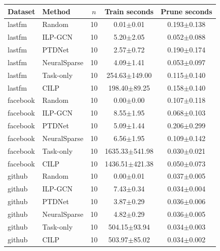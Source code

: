 \begin{tabular}{@{}llccc@{}}
\toprule
Dataset & Method & $n$ & Train seconds & Prune seconds \\
\midrule
lastfm & Random & 10 & 0.01$\pm$0.01 & 0.193$\pm$0.138 \\
lastfm & ILP-GCN & 10 & 5.20$\pm$2.05 & 0.052$\pm$0.088 \\
lastfm & PTDNet & 10 & 2.57$\pm$0.72 & 0.190$\pm$0.174 \\
lastfm & NeuralSparse & 10 & 4.09$\pm$1.41 & 0.053$\pm$0.097 \\
lastfm & Task-only & 10 & 254.63$\pm$149.00 & 0.115$\pm$0.140 \\
lastfm & CILP & 10 & 198.40$\pm$89.25 & 0.158$\pm$0.140 \\
facebook & Random & 10 & 0.00$\pm$0.00 & 0.107$\pm$0.118 \\
facebook & ILP-GCN & 10 & 8.55$\pm$1.95 & 0.068$\pm$0.103 \\
facebook & PTDNet & 10 & 5.09$\pm$1.44 & 0.206$\pm$0.299 \\
facebook & NeuralSparse & 10 & 6.56$\pm$1.95 & 0.109$\pm$0.142 \\
facebook & Task-only & 10 & 1635.33$\pm$541.98 & 0.030$\pm$0.021 \\
facebook & CILP & 10 & 1436.51$\pm$421.38 & 0.050$\pm$0.073 \\
github & Random & 10 & 0.00$\pm$0.01 & 0.037$\pm$0.005 \\
github & ILP-GCN & 10 & 7.43$\pm$0.34 & 0.034$\pm$0.004 \\
github & PTDNet & 10 & 3.87$\pm$0.29 & 0.036$\pm$0.006 \\
github & NeuralSparse & 10 & 4.82$\pm$0.29 & 0.036$\pm$0.005 \\
github & Task-only & 10 & 504.15$\pm$93.94 & 0.034$\pm$0.003 \\
github & CILP & 10 & 503.97$\pm$85.02 & 0.034$\pm$0.002 \\
\bottomrule
\end{tabular}
